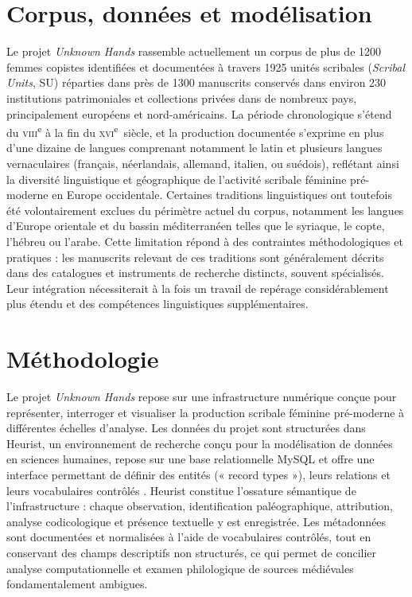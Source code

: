 \documentclass[final, fra]{anthology-ch}      %
\begin{document}
\section{Corpus, données et modélisation}

Le projet \textit{Unknown Hands} rassemble actuellement un corpus de plus de 1200 femmes copistes identifiées et documentées à travers 1925 unités scribales (\textit{Scribal Units}, SU) réparties dans près de 1300 manuscrits conservés dans environ 230 institutions patrimoniales et collections privées dans de nombreux pays, principalement européens et nord-américains. La période chronologique s'étend du \textsc{viii}\textsuperscript{e} à la fin du \textsc{xvi}\textsuperscript{e}~siècle, et la production documentée s'exprime en plus d’une dizaine de langues comprenant notamment le latin et plusieurs langues vernaculaires (français, néerlandais, allemand, italien, ou suédois), reflétant ainsi la diversité linguistique et géographique de l'activité scribale féminine pré-moderne en Europe occidentale.  Certaines traditions linguistiques ont toutefois été volontairement exclues du périmètre actuel du corpus, notamment les langues d’Europe orientale et du bassin méditerranéen telles que le syriaque, le copte, l'hébreu \cite{RieglerBaskin2008} ou l'arabe. Cette limitation répond à des contraintes méthodologiques et pratiques : les manuscrits relevant de ces traditions sont généralement décrits dans des catalogues et instruments de recherche distincts, souvent spécialisés. Leur intégration nécessiterait à la fois un travail de repérage considérablement plus étendu et des compétences linguistiques supplémentaires.

\section{Méthodologie}
Le projet \textit{Unknown Hands} repose sur une infrastructure numérique conçue pour représenter, interroger et visualiser la production scribale féminine pré-moderne à différentes échelles d’analyse. Les données du projet sont structurées dans Heurist, un environnement de recherche conçu pour la modélisation de données en sciences humaines, repose sur une base relationnelle MySQL et offre une interface permettant de définir des entités (« record types »), leurs relations et leurs vocabulaires contrôlés \cite{Johnson2008Heurist}. Heurist constitue l’ossature sémantique de l’infrastructure : chaque observation, identification paléographique, attribution, analyse codicologique et présence textuelle y est enregistrée. Les métadonnées sont documentées et normalisées à l’aide de vocabulaires contrôlés, tout en conservant des champs descriptifs non structurés, ce qui permet de concilier analyse computationnelle et examen philologique de sources médiévales fondamentalement ambigues.
\end{document}
